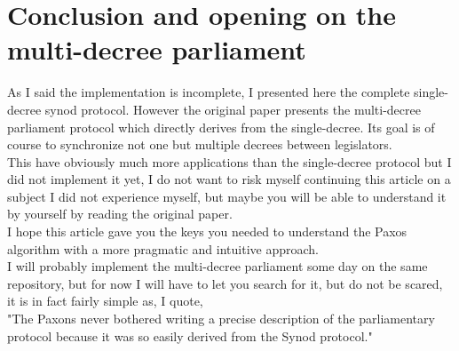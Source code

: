 \documentclass{article}
\begin{document}
\pagebreak

\section{Conclusion and opening on the multi-decree parliament}
As I said the implementation is incomplete, I presented here the complete single-decree synod protocol. However the original paper presents the multi-decree parliament protocol which directly derives from the single-decree. Its goal is of course to synchronize not one but multiple decrees between legislators.\\
This have obviously much more applications than the single-decree protocol but I did not implement it yet, I do not want to risk myself continuing this article on a subject I did not experience myself, but maybe you will be able to understand it by yourself by reading the original paper.\\
I hope this article gave you the keys you needed to understand the Paxos algorithm with a more pragmatic and intuitive approach.\\
I will probably implement the multi-decree parliament some day on the same repository, but for now I will have to let you search for it, but do not be scared, it is in fact fairly simple as, I quote,\\

"The Paxons never bothered writing a precise description of the parliamentary protocol because it was so easily derived from the Synod protocol."
\end{document}
